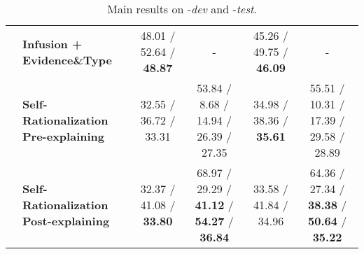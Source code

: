 \begin{table*}[tp!]
{\begin{tabular}{llcccc}
& \textbf{Infusion + Evidence\&Type}   &
48.01 / 52.64 / \textbf{48.87}  &
-  &
45.26 / 49.75 / \textbf{46.09}  &
-  \\

& \textbf{Self-Rationalization Pre-explaining}  &
32.55 / 36.72 / 33.31  &
53.84 / 8.68 / 14.94 / 26.39 / 27.35  &
34.98 / 38.36 / \textbf{35.61} &
55.51 / 10.31 / 17.39 / 29.58 / 28.89  \\

& \textbf{Self-Rationalization Post-explaining}  &
32.37 / 41.08 / \textbf{33.80}  &
68.97 / 29.29 / \textbf{41.12} / \textbf{54.27} / \textbf{36.84}  &
33.58 / 41.84 / 34.96  &
64.36 / 27.34 / \textbf{38.38} / \textbf{50.64} / \textbf{35.22}  \\

\bottomrule
\end{tabular}}

\caption{Main results on \Dataset{}-\textit{dev} and \Dataset{}-\textit{test}.}
\label{tab:exp_main}

\end{table*}
